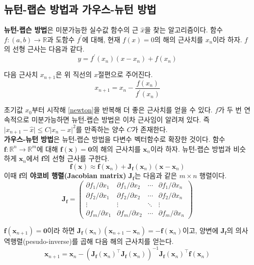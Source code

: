 \documentclass{Humantech_Paper_Awardfullpaper_hutech}
\begin{document}
\subsection{뉴턴-랩슨 방법과 가우스-뉴턴 방법}
\textbf{뉴턴-랩슨 방법}은 미분가능한 실수값 함수의 근 $\hat{x}$을 찾는 알고리즘이다. 함수 $f\colon(a, b)\to\mathbb{R}$과 도함수 $f^\prime$에 대해, 현재 $f(x)=0$의 해의 근사치를 $x_n$이라 하자. $f$의 선형 근사는 다음과 같다.
\begin{equation*}
	y=f^\prime(x_n)(x-x_n)+f(x_n)
\end{equation*}

다음 근사치 $x_{n+1}$은 위 직선의 $x$절편으로 주어진다.
\begin{equation} \label{newton}
	x_{n+1}=x_n-\frac{f(x_{n})}{f^\prime(x_n)}
\end{equation}

초기값 $x_0$부터 시작해 \eqref{newton}을 반복해 더 좋은 근사치를 얻을 수 있다. $f$가 두 번 연속적으로 미분가능하면 뉴턴-랩슨 방법은 이차 근사임이 알려져 있다. 즉 $\vert x_{n+1} - \hat{x} \vert \leq C \vert x_n - \hat{x} \vert ^2$를 만족하는 양수 $C$가 존재한다. \\

\textbf{가우스-뉴턴 방법}은 뉴턴-랩슨 방법을 다변수 벡터함수로 확장한 것이다. 함수 $\mathbf{f} \colon \mathbb{R}^n \to \mathbb{R}^m$에 대해 $\mathbf{f}(\mathbf{x}) = \mathbf{0}$의 해의 근사치를 $\mathbf{x}_n$이라 하자. 뉴턴-랩슨 방법과 비슷하게 $\mathbf{x}_n$에서 $\mathbf{f}$의 선형 근사를 구한다. 
$$ \mathbf{f}(\mathbf{x}) \approx \mathbf{f}(\mathbf{x}_n) + \mathbf{J}_{\mathbf{f}}(\mathbf{x}_n) (\mathbf{x} - \mathbf{x}_n) $$
이때 $\mathbf{f}$의 \textbf{야코비 행렬(Jacobian matrix)} $\mathbf{J}_{\mathbf{f}}$는 다음과 같은 $m \times n$ 행렬이다. 
$$ \mathbf{J}_{\mathbf{f}}= \begin{pmatrix} \partial f_1 / \partial x_1 & \partial f_1 / \partial x_2 & \cdots & \partial f_1 / \partial x_n \\ \partial f_2 / \partial x_1 & \partial f_2 / \partial x_2 & \cdots & \partial f_2 / \partial x_n \\ \vdots & \vdots & \ddots & \vdots \\ \partial f_m / \partial x_1 & \partial f_m / \partial x_2 & \cdots & \partial f_m / \partial x_n \end{pmatrix}$$

$\mathbf{f}(\mathbf{x}_{n+1}) = \mathbf{0}$이라 하면 $\mathbf{J}_{\mathbf{f}}(\mathbf{x}_n) (\mathbf{x}_{n+1} - \mathbf{x}_n) = -\mathbf{f}(\mathbf{x}_n)$이고, 양변에 $\mathbf{J}_\mathbf{f}$의 의사역행렬(pesudo-inverse)를 곱해 다음 해의 근사치를 얻는다. 
$$ \mathbf{x}_{n+1} = \mathbf{x}_n - (\mathbf{J}_{\mathbf{f}}(\mathbf{x}_n)^\intercal \mathbf{J}_{\mathbf{f}}(\mathbf{x}_n))^{-1} \mathbf{J}_{\mathbf{f}}(\mathbf{x}_n)^\intercal \mathbf{f}(\mathbf{x}_n) $$
\end{document}
